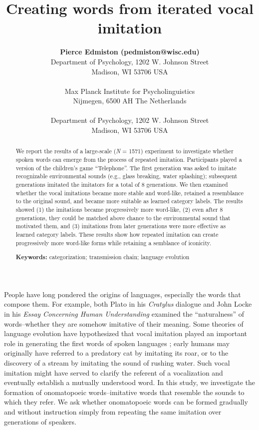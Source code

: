 \documentclass[10pt,letterpaper]{article}
\title{Creating words from iterated vocal imitation}
\author{{\large \bf Pierce Edmiston (pedmiston@wisc.edu)} \\
  Department of Psychology, 1202 W. Johnson Street \\
  Madison, WI 53706 USA \\
  \AND {\large \bf Marcus Perlman (marcus.perlman@mpi.nl)} \\
  Max Planck Institute for Psycholinguistics \\ 
  Nijmegen, 6500 AH The Netherlands \\
  \AND {\large \bf Gary Lupyan (lupyan@wisc.edu)} \\
  Department of Psychology, 1202 W. Johnson Street \\
  Madison, WI 53706 USA}
\begin{document}
\maketitle

\begin{abstract}
We report the results of a large-scale (\emph{N} = 1571) experiment to
investigate whether spoken words can emerge from the process of repeated
imitation. Participants played a version of the children's game
``Telephone''. The first generation was asked to imitate recognizable
environmental sounds (e.g., glass breaking, water splashing); subsequent
generations imitated the imitators for a total of 8 generations. We then
examined whether the vocal imitations became more stable and word-like,
retained a resemblance to the original sound, and became more suitable
as learned category labels. The results showed (1) the imitations became
progressively more word-like, (2) even after 8 generations, they could
be matched above chance to the environmental sound that motivated them,
and (3) imitations from later generations were more effective as learned
category labels. These results show how repeated imitation can create
progressively more word-like forms while retaining a semblance of
iconicity.

\textbf{Keywords:}
categorization; transmission chain; language evolution

\end{abstract}

People have long pondered the origins of languages, especially the words
that compose them. For example, both Plato in his \emph{Cratylus}
dialogue \citep{Plato:1999uk} and John Locke in his \emph{Essay
Concerning Human Understanding} \citep{Locke:1948eu} examined the
``naturalness'' of words--whether they are somehow imitative of their
meaning. Some theories of language evolution have hypothesized that
vocal imitation played an important role in generating the first words
of spoken languages
\citep[e.g.,][]{Brown:1955wy, Donald:2016kd, Imai:2014dea, Perlman:2015ip};
early humans may originally have referred to a predatory cat by
imitating its roar, or to the discovery of a stream by imitating the
sound of rushing water. Such vocal imitation might have served to
clarify the referent of a vocalization and eventually establish a
mutually understood word. In this study, we investigate the formation of
onomatopoeic words--imitative words that resemble the sounds to which
they refer. We ask whether onomatopoeic words can be formed gradually
and without instruction simply from repeating the same imitation over
generations of speakers.
\end{document}
